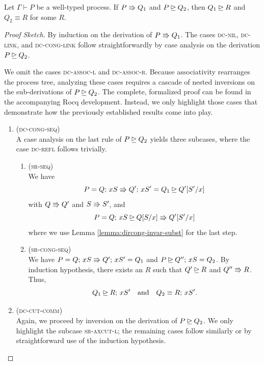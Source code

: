 \begin{lemma} \label{lemma:compat-simplred-dircong}
  Let $\Gamma \vdash P$ be a well-typed process.
  If $P \Rrightarrow Q_1$ and $P \unrhd Q_2$, then $Q_1 \unrhd R$ and $Q_2 \equiv R$
  for some $R$.
\end{lemma}
\begin{proof}[Proof Sketch]
  By induction on the derivation of $P \Rrightarrow Q_1$. The cases
  \textsc{dc-nil}, \textsc{dc-link}, and \textsc{dc-cong-link} follow straightforwardly
  by case analysis on the derivation $P \unrhd Q_2$.

  We omit the cases \textsc{dc-assoc-l} and \textsc{dc-assoc-r}.
  Because associativity rearranges the process tree,
  analyzing these cases requires a cascade of nested inversions
  on the sub-derivations of $P \unrhd Q_2$.
  The complete, formalized proof can be found in the accompanying Rocq development.
  Instead, we only highlight those cases that demonstrate how the previously established
  results come into play.

  \begin{enumerate}[itemsep=1em, label=Case:, leftmargin=*]
    \item (\textsc{dc-cong-seq}) \\
      A case analysis on the last rule of $P \unrhd Q_2$ yields three subcases,
      where the case \textsc{dc-refl} follows trivially.
      \begin{enumerate}[itemsep=1em, label=Subcase:]
        \item (\textsc{sr-seq}) \\
          We have
          \[
            P = Q ;\, xS \Rrightarrow Q' ;\, xS' = Q_1 \unrhd Q'[S'/x]
          \]
          with $Q \Rrightarrow Q'$ and $S \Rrightarrow S'$, and
          \[
            P = Q ;\, xS \unrhd Q[S/x] \Rrightarrow Q'[S'/x]
          \]
          where we use Lemma \ref{lemma:dircong-invar-subst} for the last step.
        \item (\textsc{sr-cong-seq}) \\
          We have $P = Q ;\, xS \Rrightarrow Q' ;\, xS' = Q_1$ and $P \unrhd Q'' ;\, xS = Q_2$.
          By induction hypothesis, there exists an $R$ such that $Q' \unrhd R$
          and $Q'' \Rrightarrow R$. Thus,
          \[
            Q_1 \unrhd R ;\, xS' \quad \text{and} \quad
            Q_2 \equiv R ;\, xS'.
          \]
      \end{enumerate}
    \item (\textsc{dc-cut-comm}) \\
      Again, we proceed by inversion on the derivation of $P \unrhd Q_2$.
      We only highlight the subcase \textsc{sr-axcut-l}; the remaining cases
      follow similarly or by straightforward use of the induction hypothesis.


\end{enumerate}
\end{proof}
